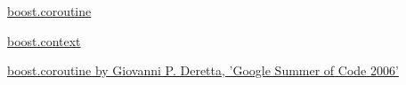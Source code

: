 \begin{thebibliography}{99}

        \href{http://www.boost.org/doc/libs/1_53_0/libs/coroutine/doc/html/index.html}
        {boost.coroutine}

        \href{http://www.boost.org/doc/libs/1_53_0/libs/context/doc/html/index.html}
        {boost.context}

        \href{http://www.crystalclearsoftware.com/soc/coroutine/}
        {boost.coroutine by Giovanni P. Deretta, 'Google Summer of Code 2006'}

\end{thebibliography}

